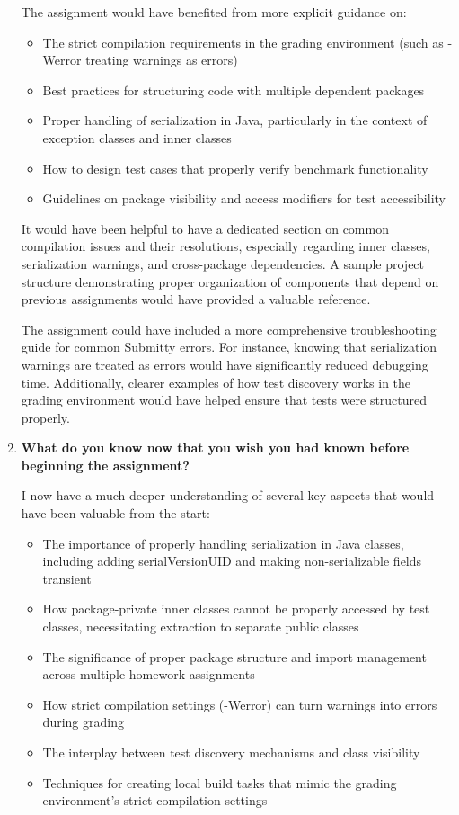 \documentclass[11pt]{article}
\begin{document}
\begin{enumerate}
    The assignment would have benefited from more explicit guidance on:
    
    \begin{itemize}
        \item The strict compilation requirements in the grading environment (such as -Werror treating warnings as errors)
        \item Best practices for structuring code with multiple dependent packages
        \item Proper handling of serialization in Java, particularly in the context of exception classes and inner classes
        \item How to design test cases that properly verify benchmark functionality
        \item Guidelines on package visibility and access modifiers for test accessibility
    \end{itemize}
    
    It would have been helpful to have a dedicated section on common compilation issues and their resolutions, especially regarding inner classes, serialization warnings, and cross-package dependencies. A sample project structure demonstrating proper organization of components that depend on previous assignments would have provided a valuable reference.
    
    The assignment could have included a more comprehensive troubleshooting guide for common Submitty errors. For instance, knowing that serialization warnings are treated as errors would have significantly reduced debugging time. Additionally, clearer examples of how test discovery works in the grading environment would have helped ensure that tests were structured properly.

    \item \textbf{What do you know now that you wish you had known before beginning the assignment?}
    
    I now have a much deeper understanding of several key aspects that would have been valuable from the start:
    
    \begin{itemize}
        \item The importance of properly handling serialization in Java classes, including adding serialVersionUID and making non-serializable fields transient
        \item How package-private inner classes cannot be properly accessed by test classes, necessitating extraction to separate public classes
        \item The significance of proper package structure and import management across multiple homework assignments
        \item How strict compilation settings (-Werror) can turn warnings into errors during grading
        \item The interplay between test discovery mechanisms and class visibility
        \item Techniques for creating local build tasks that mimic the grading environment's strict compilation settings
    \end{itemize}
    

\end{enumerate}
\end{document}
